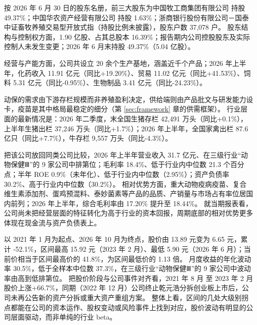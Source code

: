  按 2026 年 6 月 30 日的股东名册，前三大股东为中国牧工商集团有限公司 持股 49.37\%；中国华农资产经营有限公司 持股 1.63\%；浙商银行股份有限公司－国泰中证畜牧养殖交易型开放式指（持股比例未披露），股东户数 37,078 户。 股东结构与控制权方面，1.90 亿股、占其总股本 16.39\%；报告期内公司控股股东及实际控制人未发生变更；2026 年 6 月末持股 49.37\%（5.04 亿股）。

 经营与产能方面，公司共设立 20 余个生产基地，涵盖近千个产品；2026 年上半年，化药收入 11.91 亿元（同比+19.20\%）、贸易 11.02 亿元（同比+41.53\%）、饲料 5.31 亿元（同比-0.95\%）、生物制品 3.41 亿元（同比-24.23\%）。

 动保的需求由下游存栏规模而非养殖盈利决定，供给端则由产品批文与研发能力设卡，疫苗是其中格局最稳定的细分（第 \ref{sec:framework} 章的供需框架）。 行业层面的最新情况是：2026 年二季度，末全国生猪存栏 42,491 万头（同比+0.1\%），上半年生猪出栏 37,246 万头（同比+1.7\%）；2026 年上半年，全国家禽出栏 87.6 亿只（同比+7.7\%），牛存栏 9,557 万头（同比-4.3\%）。

 把该公司放回同类公司比较，2026 年上半年营业收入 31.7 亿元、在三级行业“动物保健Ⅲ”的 9 家公司中排第位；毛利率 18.4\%、低于行业内中位数 21.3 个百分点；半年 ROE 0.9\%（未年化）、低于行业内中位数（2.95\%）；资产负债率 30.2\%、高于行业内中位数（30.2\%）。 相对优势方面，重大动物疫病疫苗、复合维生素添加剂、蛋鸡预混料、泰妙菌素等产品的品质、产销量与市场占有率位居国内前列；2026 年上半年，综合毛利率由 17.20\% 提升至 18.44\%。 就当期报表看，公司尚未把经营层面的特征转化为高于行业的资本回报，周期底部的相对优势更多体现在现金流与资产负债表上。

 以 2021 年 1 月为起点、2026 年 10 月为终点，股价由 13.89 元变为 6.65 元，累计 -52.1\%，区间最高 15.92 元（2023 年 2 月）、最低 5.90 元（2026 年 6 月）；当前价相当于区间最高价的 41.8\%，为区间最低价的 1.13 倍。 月度收益的年化波动率 30.5\%，低于全样本中位数 37.3\%，在三级行业“动物保健Ⅲ”的 9 家公司中波动率由高到低排第位。 把股价阶段与公司事件对齐看，2021 年 8 月 至 2023 年 2 月股价上涨+66.7\%，同期（2022 年 12 月）公司终止乾元浩分拆创业板上市后，公司未再公告新的资产分拆或重大资产重组方案。 整体上看，区间的几处大级别拐点都能在公司的资本运作、股权变动或风险事件上找到对应，股价波动有明显的公司层面驱动，而非单纯的行业 beta。

